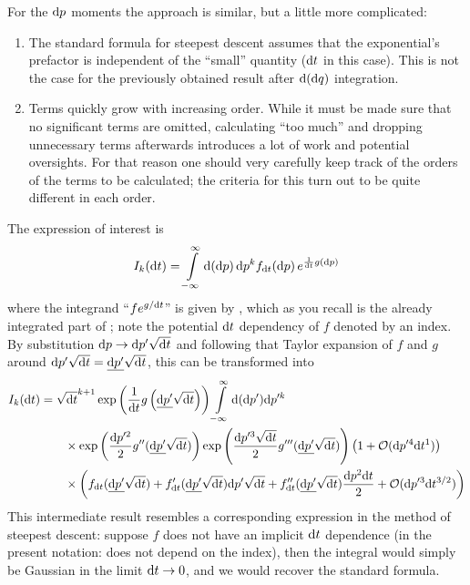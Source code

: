 For the \(\mathrm{d} p\) moments the approach is similar, but a little more complicated:
%
\begin{enumerate}
	\item The standard formula for steepest descent assumes that the exponential's prefactor is independent of the ``small'' quantity (\(\mathrm{d} t\) in this case). This is not the case for the previously obtained result after \(\mathrm{d}(\mathrm{d} q)\) integration.
	\item Terms quickly grow with increasing order. While it must be made sure that no significant terms are omitted, calculating ``too much'' and dropping unnecessary terms afterwards introduces a lot of work and potential oversights. For that reason one should very carefully keep track of the orders of the terms to be calculated; the criteria for this turn out to be quite different in each order.
\end{enumerate}
%
The expression of interest is
\begin{align}
	\label{eqn:dp-moments-integral}
	I_k(\mathrm{d} t) = \int\limits_{-\infty}^\infty \mathrm{d} (\mathrm{d} p) \, \mathrm{d} p^k f_{\mathrm{d} t}(\mathrm{d} p) \, e^{\frac1{\mathrm{d} t}g(\mathrm{d} p)}
\end{align}
where the integrand ``\(fe^{g/\mathrm{d} t}\)'' is given by , which as you recall is the already integrated part of ; note the potential \(\mathrm{d} t\) dependency of \(f\) denoted by an index. By substitution \(\mathrm{d} p\rightarrow \mathrm{d} p'\sqrt{\mathrm{d} t}\) and following that Taylor expansion of \(f\) and \(g\) around \(\mathrm{d} p'\sqrt{\mathrm{d} t} = \underline{\mathrm{d} p'}\sqrt{\mathrm{d} t}\), this can be transformed into
\begin{align}
	\label{eqn:I_k(dt)}
	I_k(\mathrm{d} t) &=
		\sqrt{\mathrm{d} t}^{k+1}
		\operatorname{exp}\left(\frac1{\mathrm{d} t}g\left(\underline{\mathrm{d} p'}\sqrt{\mathrm{d} t}\right)\right)
		\int\limits_{-\infty}^\infty \mathrm{d} (\mathrm{d} p') \mathrm{d} p'^k
		\\ &\qquad \notag \times
		\operatorname{exp}\left(\frac{\mathrm{d} p'^2}2 g''(\underline{\mathrm{d} p'}\sqrt{\mathrm{d} t})\right)
		\operatorname{exp}\left(\frac{\mathrm{d} p'^3\sqrt{\mathrm{d} t}}2 g'''(\underline{\mathrm{d} p'}\sqrt{\mathrm{d} t})\right)
		\left(1 + \mathcal{O}(\mathrm{d} p'^4 \mathrm{d} t^1)\right)
		\\ &\qquad \notag \times
		\left(
			f_{\mathrm{d} t}(\underline{\mathrm{d} p'}\sqrt{\mathrm{d} t})
			+ f_{\mathrm{d} t}'(\underline{\mathrm{d} p'}\sqrt{\mathrm{d} t})\mathrm{d} p'\sqrt{\mathrm{d} t}
			+ f_{\mathrm{d} t}''(\underline{\mathrm{d} p'}\sqrt{\mathrm{d} t})\frac{\mathrm{d} p^2\mathrm{d} t}2
			+ \mathcal{O}(\mathrm{d} p'^3\mathrm{d} t^{3/2})
		\right)
\end{align}
This intermediate result resembles a corresponding expression in the method of steepest descent: suppose \(f\) does not have an implicit \(\mathrm{d} t\) dependence (in the present notation: does not depend on the index), then the integral would simply be Gaussian in the limit \(\mathrm{d} t\to0\), and we would recover the standard formula.

